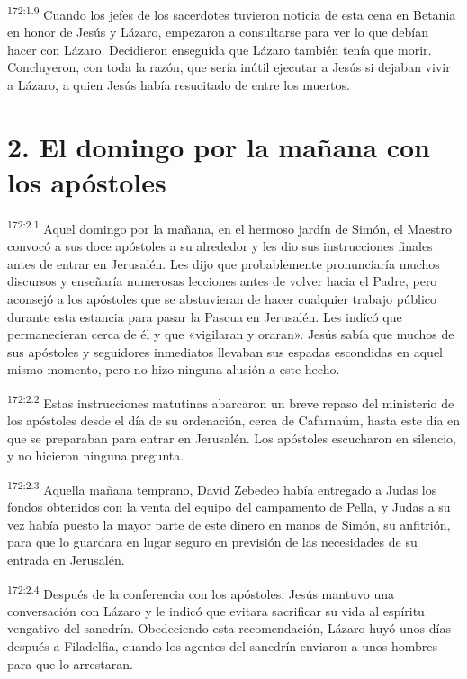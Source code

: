 \par 
\textsuperscript{172:1.9} Cuando los jefes de los sacerdotes tuvieron noticia de esta cena en Betania en honor de Jesús y Lázaro, empezaron a consultarse para ver lo que debían hacer con Lázaro. Decidieron enseguida que Lázaro también tenía que morir. Concluyeron, con toda la razón, que sería inútil ejecutar a Jesús si dejaban vivir a Lázaro, a quien Jesús había resucitado de entre los muertos.

\section*{2. El domingo por la mañana con los apóstoles}
\par 
\textsuperscript{172:2.1} Aquel domingo por la mañana, en el hermoso jardín de Simón, el Maestro convocó a sus doce apóstoles a su alrededor y les dio sus instrucciones finales antes de entrar en Jerusalén. Les dijo que probablemente pronunciaría muchos discursos y enseñaría numerosas lecciones antes de volver hacia el Padre, pero aconsejó a los apóstoles que se abstuvieran de hacer cualquier trabajo público durante esta estancia para pasar la Pascua en Jerusalén. Les indicó que permanecieran cerca de él y que «vigilaran y oraran». Jesús sabía que muchos de sus apóstoles y seguidores inmediatos llevaban sus espadas escondidas en aquel mismo momento, pero no hizo ninguna alusión a este hecho.

\par 
\textsuperscript{172:2.2} Estas instrucciones matutinas abarcaron un breve repaso del ministerio de los apóstoles desde el día de su ordenación, cerca de Cafarnaúm, hasta este día en que se preparaban para entrar en Jerusalén. Los apóstoles escucharon en silencio, y no hicieron ninguna pregunta.

\par 
\textsuperscript{172:2.3} Aquella mañana temprano, David Zebedeo había entregado a Judas los fondos obtenidos con la venta del equipo del campamento de Pella, y Judas a su vez había puesto la mayor parte de este dinero en manos de Simón, su anfitrión, para que lo guardara en lugar seguro en previsión de las necesidades de su entrada en Jerusalén.

\par 
\textsuperscript{172:2.4} Después de la conferencia con los apóstoles, Jesús mantuvo una conversación con Lázaro y le indicó que evitara sacrificar su vida al espíritu vengativo del sanedrín. Obedeciendo esta recomendación, Lázaro huyó unos días después a Filadelfia, cuando los agentes del sanedrín enviaron a unos hombres para que lo arrestaran.

